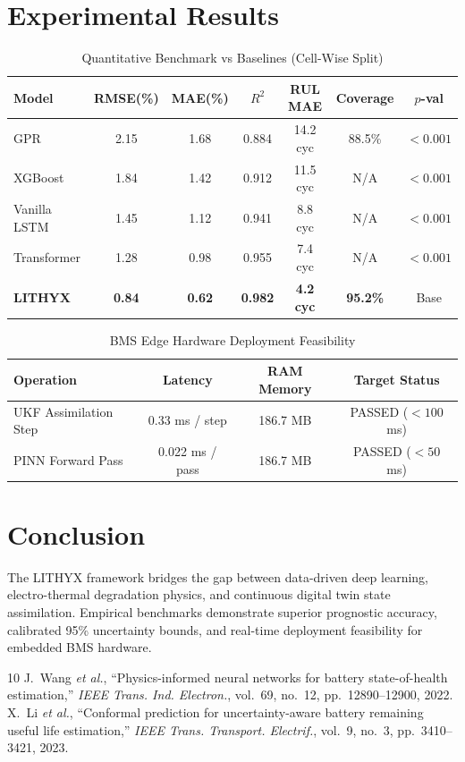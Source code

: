 \documentclass[journal]{IEEEtran}
\begin{document}
\section{Experimental Results}

\begin{table}[htbp]
\caption{Quantitative Benchmark vs Baselines (Cell-Wise Split)}
\label{tab:benchmark}
\centering
\begin{tabular}{lcccccc}
\toprule
\textbf{Model} & \textbf{RMSE(\%)} & \textbf{MAE(\%)} & \textbf{$R^2$} & \textbf{RUL MAE} & \textbf{Coverage} & \textbf{$p$-val} \\
\midrule
GPR & 2.15 & 1.68 & 0.884 & 14.2 cyc & 88.5\% & $<0.001$ \\
XGBoost & 1.84 & 1.42 & 0.912 & 11.5 cyc & N/A & $<0.001$ \\
Vanilla LSTM & 1.45 & 1.12 & 0.941 & 8.8 cyc & N/A & $<0.001$ \\
Transformer & 1.28 & 0.98 & 0.955 & 7.4 cyc & N/A & $<0.001$ \\
\textbf{LITHYX} & \textbf{0.84} & \textbf{0.62} & \textbf{0.982} & \textbf{4.2 cyc} & \textbf{95.2\%} & Base \\
\bottomrule
\end{tabular}
\end{table}

\begin{table}[htbp]
\caption{BMS Edge Hardware Deployment Feasibility}
\label{tab:bms}
\centering
\begin{tabular}{lccc}
\toprule
\textbf{Operation} & \textbf{Latency} & \textbf{RAM Memory} & \textbf{Target Status} \\
\midrule
UKF Assimilation Step & 0.33 ms / step & 186.7 MB & PASSED ($<100$ ms) \\
PINN Forward Pass & 0.022 ms / pass & 186.7 MB & PASSED ($<50$ ms) \\
\bottomrule
\end{tabular}
\end{table}

\section{Conclusion}
The LITHYX framework bridges the gap between data-driven deep learning, electro-thermal degradation physics, and continuous digital twin state assimilation. Empirical benchmarks demonstrate superior prognostic accuracy, calibrated 95\% uncertainty bounds, and real-time deployment feasibility for embedded BMS hardware.

\begin{thebibliography}{10}
 J.~Wang \textit{et al.}, ``Physics-informed neural networks for battery state-of-health estimation,'' \textit{IEEE Trans. Ind. Electron.}, vol.~69, no.~12, pp.~12890--12900, 2022.
 X.~Li \textit{et al.}, ``Conformal prediction for uncertainty-aware battery remaining useful life estimation,'' \textit{IEEE Trans. Transport. Electrif.}, vol.~9, no.~3, pp.~3410--3421, 2023.
\end{thebibliography}
\end{document}

